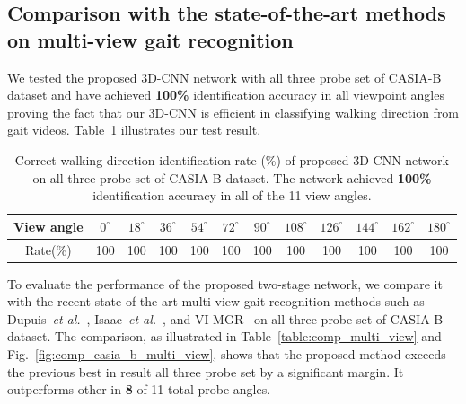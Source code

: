 

\subsection{Comparison with the state-of-the-art methods on multi-view gait recognition}
We tested the proposed 3D-CNN network with all three probe set of CASIA-B dataset and have achieved \textbf{100\%} identification accuracy in all viewpoint angles proving the fact that our 3D-CNN is efficient in classifying walking direction from gait videos. Table~\ref{table:result_wd_identification} illustrates our test result. 


\begin{table}[t]
	\centering
	\caption{Correct walking direction identification rate (\%) of proposed 3D-CNN network on all three probe set of CASIA-B dataset. The network achieved \textbf{100\%} identification accuracy in all of the 11 view angles. \label{table:result_wd_identification}}
	{\begin{tabular*}{35pc}{cccc cccc cccc}\hline \noalign{\smallskip}
			View angle &${0^{\circ}}$	&${18^{\circ}}$  &${36^{\circ}}$ &${54^{\circ}}$	&${72^{\circ}}$	&${90^{\circ}}$	&${108^{\circ}}$ &${126^{\circ}}$ &${144^{\circ}}$ &${162^{\circ}}$  &${180^{\circ}}$ \\\hline \noalign{\smallskip}
			
			Rate(\%) &100 &100 &100 &100 &100 &100 &100 &100 &100 &100 &100 \\ \hline
	\end{tabular*}}{}
\end{table}

To evaluate the performance of the proposed two-stage network, we compare it with the recent state-of-the-art multi-view gait recognition methods such as Dupuis~\textit{et al.}~\cite{Dupuis_13}, Isaac~\textit{et al.}~\cite{Isaac_17}, and VI-MGR~\cite{Choudhury_15} on all three probe set of CASIA-B dataset. The comparison, as illustrated in Table~\ref{table:comp_multi_view} and Fig.~\ref{fig:comp_casia_b_multi_view}, shows that the proposed method exceeds the previous best in result all three probe set by a significant margin. It outperforms other in \textbf{8} of 11 total probe angles.

